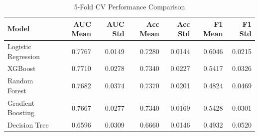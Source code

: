 \begin{table}
\caption{5-Fold CV Performance Comparison}
\label{tab:performance}
\begin{tabular}{lrrrrrr}
\toprule
Model & AUC Mean & AUC Std & Acc Mean & Acc Std & F1 Mean & F1 Std \\
\midrule
Logistic Regression & 0.7767 & 0.0149 & 0.7280 & 0.0144 & 0.6046 & 0.0215 \\
XGBoost & 0.7710 & 0.0278 & 0.7340 & 0.0227 & 0.5417 & 0.0326 \\
Random Forest & 0.7682 & 0.0374 & 0.7370 & 0.0201 & 0.4824 & 0.0469 \\
Gradient Boosting & 0.7667 & 0.0277 & 0.7340 & 0.0169 & 0.5428 & 0.0301 \\
Decision Tree & 0.6596 & 0.0309 & 0.6660 & 0.0146 & 0.4932 & 0.0520 \\
\bottomrule
\end{tabular}
\end{table}

